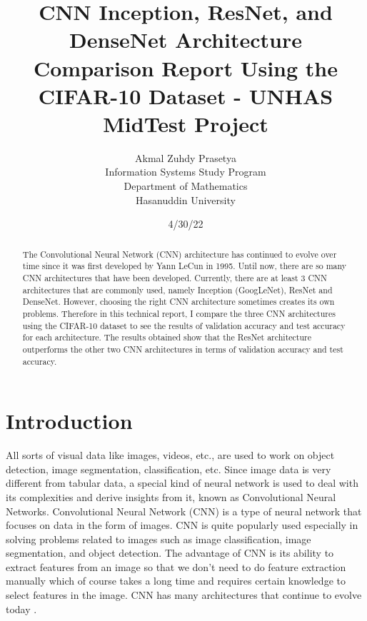 \documentclass[peerreview]{IEEEtran}
\begin{document}
\title{CNN Inception, ResNet, and DenseNet Architecture Comparison Report Using the CIFAR-10 Dataset - UNHAS MidTest Project}



\author{Akmal Zuhdy Prasetya \\
Information Systems Study Program \\
Department of Mathematics \\
Hasanuddin University\\
}
\date{4/30/22}

\maketitle
\tableofcontents
\listoffigures
\listoftables

\IEEEpeerreviewmaketitle
\begin{abstract}
The Convolutional Neural Network (CNN) architecture has continued to evolve over time since it was first developed by Yann LeCun in 1995. Until now, there are so many CNN architectures that have been developed. Currently, there are at least 3 CNN architectures that are commonly used, namely Inception (GoogLeNet), ResNet and DenseNet. However, choosing the right CNN architecture sometimes creates its own problems. Therefore in this technical report, I compare the three CNN architectures using the CIFAR-10 dataset to see the results of validation accuracy and test accuracy for each architecture. The results obtained show that the ResNet architecture outperforms the other two CNN architectures in terms of validation accuracy and test accuracy.

\end{abstract}


\section{Introduction}
All sorts of visual data like images, videos, etc., are used to work on object detection, image segmentation, classification, etc. Since image data is very different from tabular data, a special kind of neural network is used to deal with its complexities and derive insights from it, known as Convolutional Neural Networks. Convolutional Neural Network (CNN) is a type of neural network that focuses on data in the form of images. CNN is quite popularly used especially in solving problems related to images such as image classification, image segmentation, and object detection. The advantage of CNN is its ability to extract features from an image so that we don't need to do feature extraction manually which of course takes a long time and requires certain knowledge to select features in the image. CNN has many architectures that continue to evolve today \cite{wu2017introduction}. 
\end{document}
